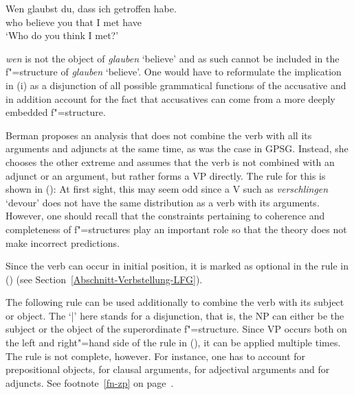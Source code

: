 {{\ea
\gll Wen glaubst du, dass ich getroffen habe.\\
	 who believe you that I met have\\
\glt `Who do you think I met?'
\z

\noindent
\emph{wen} is not the object of \emph{glauben} `believe' and as such cannot be included in the
f"=structure of \emph{glauben} `believe'. One would have to reformulate the implication in
(i) as a disjunction of all possible grammatical functions of the accusative and in addition account for the fact that accusatives can come from a more deeply embedded f"=structure.
}
\ea
\label{le-verschlingen}
\z

\noindent
Berman proposes an analysis that does not combine the verb with all its arguments and adjuncts at
the same time, as was the case in GPSG\indexgpsg. Instead, she chooses the other extreme and assumes
that the verb is not combined with an adjunct or an argument, but rather forms a VP directly. The rule for this is shown in ():
\ea
\label{LFG-v-vp}
\z
At first sight, this may seem odd since a V such as \emph{verschlingen} `devour' does not have the same distribution as a verb with its arguments. However, one should recall that the
constraints pertaining to coherence and completeness of f"=structures play an important role so that
the theory does not make incorrect predictions.
}%

Since the verb can occur in initial position, it is marked as optional in the rule in () (see Section~\ref{Abschnitt-Verbstellung-LFG}).

The following rule can be used additionally to combine the verb with its subject or object.
\ea
\label{lfg-vp-regel}
\z
The `|'\is{$\vert$} here stands for a disjunction, that is, the NP can either be the subject or the object of the superordinate f"=structure. Since VP occurs both on the left
and right"=hand side of the rule in (), it can be applied multiple times.
The rule is not complete, however. For instance, one has to account for prepositional objects, for clausal
arguments, for adjectival arguments and for adjuncts. See footnote~\ref{fn-zp} on page~\pageref{fn-zp}.

